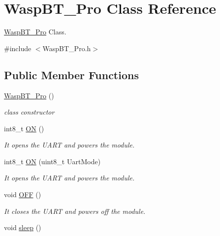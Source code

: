\hypertarget{class_wasp_b_t___pro}{}\section{Wasp\+B\+T\+\_\+\+Pro Class Reference}
\label{class_wasp_b_t___pro}


\hyperlink{class_wasp_b_t___pro}{Wasp\+B\+T\+\_\+\+Pro} Class.  




{\ttfamily \#include $<$Wasp\+B\+T\+\_\+\+Pro.\+h$>$}

\subsection*{Public Member Functions}
\begin{DoxyCompactItemize}
\item 
\hyperlink{class_wasp_b_t___pro_acd8eda62ef48a3e719e9bfa7e8520626}{Wasp\+B\+T\+\_\+\+Pro} ()
\begin{DoxyCompactList}\small\item\em class constructor \end{DoxyCompactList}\item 
int8\+\_\+t \hyperlink{class_wasp_b_t___pro_a936de5d37dda87f7eca272a1264cc16b}{ON} ()
\begin{DoxyCompactList}\small\item\em It opens the U\+A\+RT and powers the module. \end{DoxyCompactList}\item 
int8\+\_\+t \hyperlink{class_wasp_b_t___pro_a8fea382c6fb6a0e999abe33ab255a1a7}{ON} (uint8\+\_\+t Uart\+Mode)
\begin{DoxyCompactList}\small\item\em It opens the U\+A\+RT and powers the module. \end{DoxyCompactList}\item 
void \hyperlink{class_wasp_b_t___pro_a8b12a1fb5c9fbc5ab0052db9a9301628}{O\+FF} ()\hypertarget{class_wasp_b_t___pro_a8b12a1fb5c9fbc5ab0052db9a9301628}{}\label{class_wasp_b_t___pro_a8b12a1fb5c9fbc5ab0052db9a9301628}

\begin{DoxyCompactList}\small\item\em It closes the U\+A\+RT and powers off the module. \end{DoxyCompactList}\item 
void \hyperlink{class_wasp_b_t___pro_a578cd48324a8c4c686367cb7f71b0cd2}{sleep} ()\hypertarget{class_wasp_b_t___pro_a578cd48324a8c4c686367cb7f71b0cd2}{}\label{class_wasp_b_t___pro_a578cd48324a8c4c686367cb7f71b0cd2}


\end{DoxyCompactItemize}
